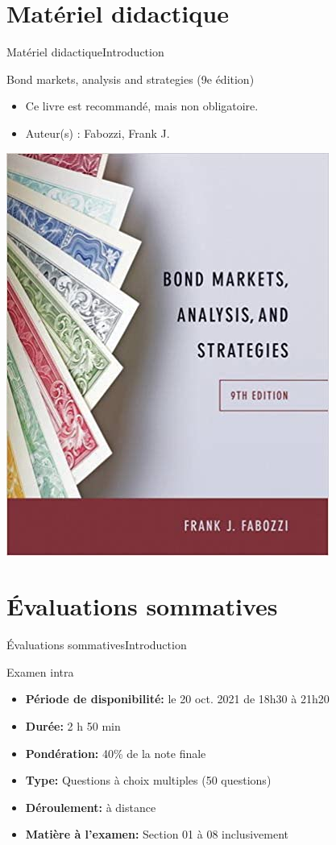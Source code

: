 \documentclass{beamer}
\begin{document}
\section{Matériel didactique}
\begin{frame}{Matériel didactique}{Introduction}
  \begin{block}{Bond markets, analysis and strategies (9e édition)}
\begin{itemize}
\item Ce livre est recommandé, mais non obligatoire.
\item Auteur(s) : Fabozzi, Frank J.
\end{itemize}
\end{block}
\begin{center}
\includegraphics[scale=0.25]{BOOK}
\end{center}
\end{frame}



\section{Évaluations sommatives}
\begin{frame}{Évaluations sommatives}{Introduction}
  \begin{block}{Examen intra}
\begin{itemize}
\item \textbf{Période de disponibilité:} 	le 20 oct. 2021 de 18h30 à 21h20
\item \textbf{Durée:} 2 h 50 min
\item \textbf{Pondération:} 40\% de la note finale 
\item \textbf{Type:} Questions à choix multiples (50 questions)
\item \textbf{Déroulement:}  à distance 
\item \textbf{Matière à l'examen:} Section 01 à 08 inclusivement 
\end{itemize}
\end{block}
\end{frame}
\end{document}
